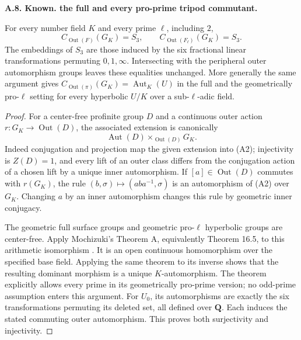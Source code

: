 \documentclass[11pt,oneside]{article}
\makeatletter
\newcounter{statementanchor}
\newenvironment{statement}[3]{%
 \refstepcounter{statementanchor}\def\@currentlabel{#1}%
 \par\addvspace{9pt}\noindent
 \textbf{#1. #2. #3.}\par\nobreak\noindent\ignorespaces
}{\par\addvspace{5pt}}
\makeatother
\begin{document}
\begin{statement}{A.8}{Known}{the full and every pro-prime tripod commutant}
\label{st:A.8}
\label{A:tripod-commutant}
For every number field $K$ and every prime $\ell$, including $2$,
\[
 C_{\operatorname{Out}(F)}(G_K)=S_3,
 \qquad
 C_{\operatorname{Out}(F_\ell)}(G_K)=S_3.
\]
The embeddings of $S_3$ are those induced by the six fractional
linear transformations permuting $0,1,\infty$.  Intersecting with
the peripheral outer automorphism groups leaves these equalities
unchanged.  More generally the same argument gives
$C_{\operatorname{Out}(\pi)}(G_K)=\operatorname{Aut}_K(U)$ in
the full and the geometrically pro-$\ell$ setting for every
hyperbolic $U/K$ over a sub-$\ell$-adic field.
\end{statement}
\begin{proof}
For a center-free profinite group $D$ and a continuous outer action
$r:G_K\to\operatorname{Out}(D)$, the associated extension is
canonically
\[
 \operatorname{Aut}(D)\mathop{\times}_{\operatorname{Out}(D)}G_K.
                                                               \tag{A2}
\]
Indeed conjugation and projection map the given extension into
(A2); injectivity is $Z(D)=1$, and every lift of an outer class
differs from the conjugation action of a chosen lift by a unique
inner automorphism.  If $[a]\in\operatorname{Out}(D)$ commutes
with $r(G_K)$, the rule $(b,\sigma)\mapsto(aba^{-1},\sigma)$
is an automorphism of (A2) over $G_K$.  Changing $a$ by an inner
automorphism changes this rule by geometric inner conjugacy.

The geometric full surface groups and geometric pro-$\ell$
hyperbolic groups are center-free.  Apply Mochizuki's Theorem A,
equivalently Theorem 16.5, to this arithmetic isomorphism
\cite{A_Mochizuki1999}.  It is an open continuous homomorphism
over the specified base field.  Applying the same theorem to its
inverse shows that the resulting dominant morphism is a unique
$K$-automorphism.  The theorem explicitly allows every prime in
its geometrically pro-prime version; no odd-prime assumption
enters this argument.  For $U_0$, its automorphisms are exactly
the six transformations permuting its deleted set, all defined
over $\mathbf Q$.  Each induces the stated commuting outer
automorphism.  This proves both surjectivity and injectivity.
\end{proof}
\end{document}
